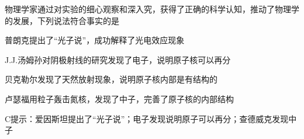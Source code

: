 物理学家通过对实验的细心观察和深入究，获得了正确的科学认知，推动了物理学的发展，下列说法符合事实的是\paren[]
\begin{choices}
    \item 普朗克提出了“光子说”，成功解释了光电效应现象
    \item J.J.汤姆孙对阴极射线的研究发现了电子，说明原子核可以再分
    \item 贝克勒尔发现了天然放射现象，说明原子核内部是有结构的
    \item 卢瑟福用粒子轰击氮核，发现了中子，完善了原子核的内部结构
\end{choices}
\begin{answer}
    C\qquad 提示：爱因斯坦提出了“光子说”；电子发现说明原子可以再分；查德威克发现中子
\end{answer}